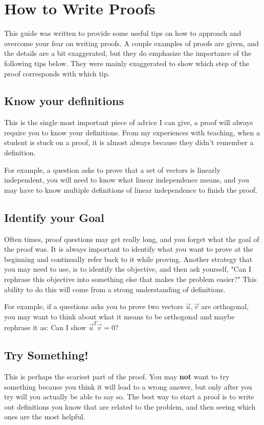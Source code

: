 
\section{How to Write Proofs}

This guide was written to provide some useful tips on how to approach and overcome your fear on writing proofs. 
A couple examples of proofs are given, and the details are a bit exaggerated, but they do emphasize the importance of the following tips below. They were mainly exaggerated to show which step of the proof corresponds with which tip.

\subsection{Know your definitions}
This is the single most important piece of advice I can give, a proof will always require you to know your definitions. 
From my experiences with teaching, when a student is stuck on a proof, it is almost always because they didn't remember a definition.

For example, a question asks to prove that a set of vectors is linearly independent, you will need to know what linear independence means, and you may have to know multiple definitions of linear independence to finish the proof. 

\subsection{Identify your Goal}
Often times, proof questions may get really long, and you forget what the goal of the proof was. 
It is always important to identify what you want to prove at the beginning and continually refer back to it while proving. 
Another strategy that you may need to use, is to identify the objective, and then ask yourself, "Can I rephrase this objective into something else that makes the problem easier?" 
This ability to do this will come from a strong understanding of definitions.

For example, if a questions asks you to prove two vectors $\vec{u}, \vec{v}$ are orthogonal, you may want to think about what it means to be orthogonal and maybe rephrase it as: Can I show $\vec{u}^{T} \vec{v} = 0?$

\subsection{Try Something!}
This is perhaps the scariest part of the proof. 
You may \textbf{not} want to try something because you think it will lead to a wrong answer, but only after you try will you actually be able to say so. 
The best way to start a proof is to write out definitions you know that are related to the problem, and then seeing which ones are the most helpful.

